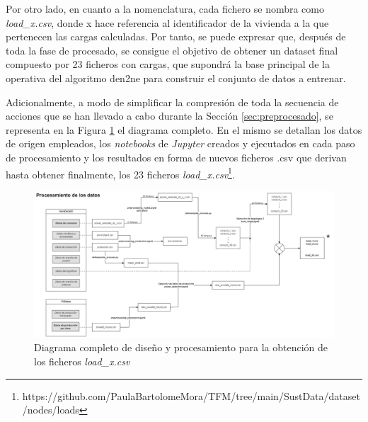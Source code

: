 Por otro lado, en cuanto a la nomenclatura, cada fichero se nombra como \textit{load\_x.csv}, donde x hace referencia al identificador de la vivienda a la que pertenecen las cargas calculadas. Por tanto, se puede expresar que, después de toda la fase de procesado, se consigue el objetivo de obtener un dataset final compuesto por 23 ficheros con cargas, que supondrá la base principal de la operativa del algoritmo \gls{den2ne} para construir el conjunto de datos a entrenar.

\vspace{3mm}

Adicionalmente, a modo de simplificar la compresión de toda la secuencia de acciones que se han llevado a cabo durante la Sección \ref{sec:preprocesado}, se representa en la Figura \ref{fig:total1} el diagrama completo. En el mismo se detallan los datos de origen empleados, los \textit{notebooks} de \textit{Jupyter} creados y ejecutados en cada paso de procesamiento y los resultados en forma de nuevos ficheros .csv que derivan hasta obtener finalmente, los 23 ficheros \textit{load\_x.csv}\footnote{https://github.com/PaulaBartolomeMora/TFM/tree/main/SustData/dataset/nodes/loads}.

\vspace{8mm}

\begin{figure}
    \centering
    \includegraphics[width=1\textwidth]{img/diseno/total1.png} 
    \caption{Diagrama completo de diseño y procesamiento para la obtención de los ficheros \textit{load\_x.csv}}
    \label{fig:total1}
\end{figure}


